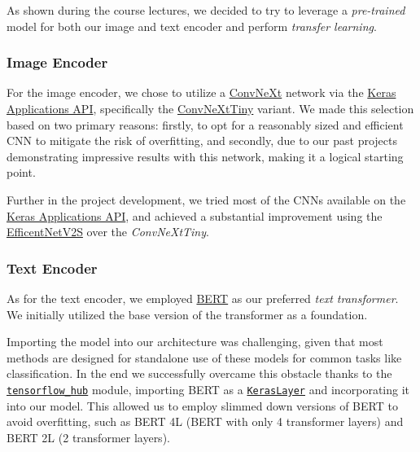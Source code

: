 \documentclass[10pt,twocolumn,letterpaper]{article}
\begin{document}
As shown during the course lectures, we decided to try to leverage a \textit{pre-trained} model for both our image and text encoder and perform \textit{transfer learning}.

\subsubsection{Image Encoder}
For the image encoder, we chose to utilize a \href{https://github.com/facebookresearch/ConvNeXt}{ConvNeXt} network via the \href{https://keras.io/api/applications/}{Keras Applications API}, specifically the \href{https://keras.io/api/applications/convnext/#convnexttiny-function}{ConvNeXtTiny} variant. %
We made this selection based on two primary reasons: firstly, to opt for a reasonably sized and efficient CNN to mitigate the risk of overfitting, and secondly, due to our past projects demonstrating impressive results with this network, making it a logical starting point.

Further in the project development, we tried most of the CNNs available on the \href{https://keras.io/api/applications/}{Keras Applications API}, and achieved a substantial improvement using the \href{https://keras.io/api/applications/efficientnet_v2/#efficientnetv2s-function}{EfficentNetV2S} over the \textit{ConvNeXtTiny}.

\subsubsection{Text Encoder}
As for the text encoder, we employed \href{https://huggingface.co/docs/transformers/model_doc/bert}{BERT} as our preferred \textit{text transformer}.
We initially utilized the base version of the transformer as a foundation.

Importing the model into our architecture was challenging, given that most methods are designed for standalone use of these models for common tasks like classification.
In the end we successfully overcame this obstacle thanks to the \href{https://www.tensorflow.org/hub}{\texttt{tensorflow\_hub}} module, importing BERT as a \href{https://www.tensorflow.org/hub/api_docs/python/hub/KerasLayer}{\texttt{KerasLayer}} and incorporating it into our model. This allowed us to employ slimmed down versions of BERT to avoid overfitting, such as BERT 4L (BERT with only 4 transformer layers) and BERT 2L (2 transformer layers).
\end{document}
